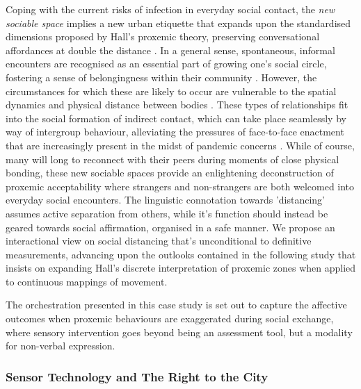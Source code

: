 Coping with the current risks of infection in everyday social contact, the \textit{new sociable space} implies a new urban etiquette that expands upon the standardised dimensions proposed by Hall's proxemic theory, preserving conversational affordances at double the distance \citep{mehta_new_2020}. In a general sense, spontaneous, informal encounters are recognised as an essential part of growing one's social circle, fostering a sense of belongingness within their community \citep{ye_ambivalence_2016}. However, the circumstances for which these are likely to occur are vulnerable to the spatial dynamics and physical distance between bodies \citep{van_den_berg_subjective_2017, fayard_photocopiers_2007}. These types of relationships fit into the social formation of indirect contact, which can take place seamlessly by way of intergroup behaviour, alleviating the pressures of face-to-face enactment \citep{white_beyond_2021} that are increasingly present in the midst of pandemic concerns \citep{durnova_intimacy_2021}. While of course, many will long to reconnect with their peers during moments of close physical bonding, these new sociable spaces provide an enlightening deconstruction of proxemic acceptability where strangers and non-strangers are both welcomed into everyday social encounters. The linguistic connotation towards 'distancing' assumes active separation from others, while it's function should instead be geared towards social affirmation, organised in a safe manner. We propose an interactional view on social distancing that's unconditional to definitive measurements, advancing upon the outlooks contained in the following study \citep{ballendat_proxemic_2010} that insists on expanding Hall's discrete interpretation of proxemic zones when applied to continuous mappings of movement. 

The orchestration presented in this case study is set out to capture the affective outcomes when proxemic behaviours are exaggerated during social exchange, where sensory intervention goes beyond being an assessment tool, but a modality for non-verbal expression.

\subsubsection{Sensor Technology and The Right to the City}
\label{subsec:shift}

